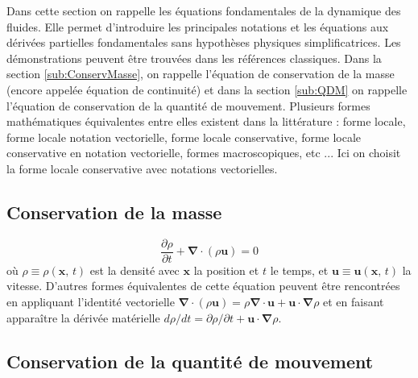 Dans cette section on rappelle les \'equations fondamentales de la dynamique
des fluides. Elle permet d'introduire les principales notations et
les \'equations aux d\'eriv\'ees partielles fondamentales sans hypoth\`eses
physiques simplificatrices. Les d\'emonstrations peuvent \^etre trouv\'ees
dans les r\'ef\'erences classiques. Dans la section \ref{sub:ConservMasse},
on rappelle l'\'equation de conservation de la masse (encore appel\'ee
\'equation de continuit\'e) et dans la section \ref{sub:QDM} on rappelle
l'\'equation de conservation de la quantit\'e de mouvement. Plusieurs
formes math\'ematiques \'equivalentes entre elles existent dans la litt\'erature
: forme locale, forme locale notation vectorielle, forme locale conservative,
forme locale conservative en notation vectorielle, formes macroscopiques,
etc ... Ici on choisit la forme locale conservative avec notations
vectorielles.


\subsection{\label{sub:ConservMasse}Conservation de la masse}

\begin{equation}
\frac{\partial\rho}{\partial t}+\boldsymbol{\nabla}\cdot(\rho\mathbf{u})=0\label{eq:ConvMasse}
\end{equation}
o\`u $\rho\equiv\rho(\mathbf{x},\,t)$ est la densit\'e avec $\mathbf{x}$
la position et $t$ le temps, et $\mathbf{u}\equiv\mathbf{u}(\mathbf{x},\,t)$
la vitesse. D'autres formes \'equivalentes de cette \'equation peuvent
\^etre rencontr\'ees en appliquant l'identit\'e vectorielle $\boldsymbol{\nabla}\cdot(\rho\mathbf{u})=\rho\boldsymbol{\nabla}\cdot\mathbf{u}+\mathbf{u}\cdot\boldsymbol{\nabla}\rho$
et en faisant appara\^itre la d\'eriv\'ee mat\'erielle $d\rho/dt=\partial\rho/\partial t+\mathbf{u}\cdot\boldsymbol{\nabla}\rho$.


\subsection{\label{sub:QDM}Conservation de la quantit\'e de mouvement}


